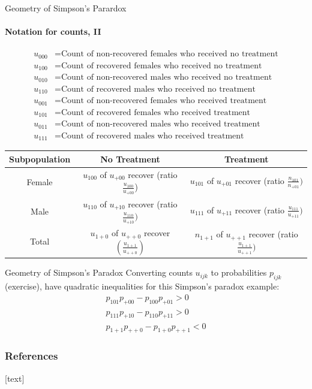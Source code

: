 \begin{frame}{Geometry of Simpson's Parardox}
  \framesubtitle{Notation for counts, II}
  \small{
    \begin{align*}
      u_{000} &= \textrm{Count of non-recovered females who received no treatment} \\
      u_{100} &= \textrm{Count of recovered females who received no treatment} \\
      u_{010} &= \textrm{Count of non-recovered males who received no treatment} \\
      u_{110} &= \textrm{Count of recovered males who received no treatment} \\
      u_{001} &= \textrm{Count of non-recovered females who received treatment} \\
      u_{101} &= \textrm{Count of recovered females who received treatment} \\
      u_{011} &= \textrm{Count of non-recovered males who received treatment} \\
      u_{111} &= \textrm{Count of recovered males who received treatment}
    \end{align*}
  }

  \begin{center}
    \begin{tabular}{ |c|c|c| }
    \hline
    Subpopulation & No Treatment & Treatment \\
    \hline
    Female & $u_{100}$ of $u_{+00}$ recover (ratio $\frac{u_{100}}{u_{+00}}$) & $u_{101}$ of $u_{+01}$ recover (ratio $\frac{n_{101}}{n_{+01}})$ \\
    Male & $u_{110}$ of $u_{+10}$  recover (ratio $\frac{u_{110}}{u_{+10}})$ & $u_{111}$ of $u_{+11}$ recover (ratio $\frac{u_{111}}{u_{+11}})$ \\
    Total & $u_{1+0}$ of $u_{++0}$  recover $\left(\frac{u_{1+1}}{u_{++0}}\right)$ & $n_{1+1}$ of $u_{++1}$  recover (ratio $\frac{u_{1+1}}{u_{++1}})$  \\
    \hline
    \end{tabular}
  \end{center}
\end{frame}

\begin{frame}{Geometry of Simpson's Paradox}
  Converting counts $u_{ijk}$ to probabilities $p_{ijk}$ (exercise), have quadratic inequalities for this Simpson's paradox example:
  \begin{align*}
    p_{101}p_{+00} - p_{100}p_{+01} > 0 \\
    p_{111}p_{+10} - p_{110}p_{+11} > 0 \\
    p_{1+1}p_{++0} - p_{1+0}p_{++1} < 0
  \end{align*}
\end{frame}



\begin{frame}[allowframebreaks]
  \frametitle{References}
  [text]
  
  
\end{frame}

